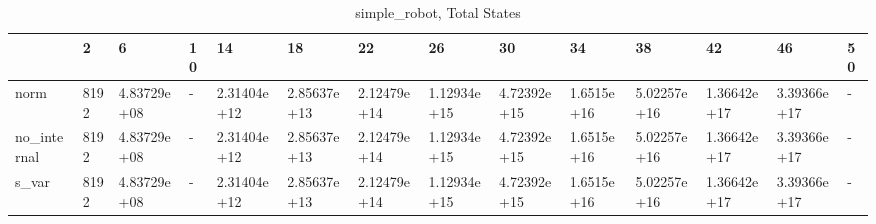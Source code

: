 \begin{table}
\caption{simple_robot, Total States}
\label{simple_robot_total}
\begin{tabular}{llllllllllllll}
\toprule
 & 2 & 6 & 10 & 14 & 18 & 22 & 26 & 30 & 34 & 38 & 42 & 46 & 50 \\
\midrule
norm & 8192 & 4.83729e+08 & - & 2.31404e+12 & 2.85637e+13 & 2.12479e+14 & 1.12934e+15 & 4.72392e+15 & 1.6515e+16 & 5.02257e+16 & 1.36642e+17 & 3.39366e+17 & - \\
no_internal & 8192 & 4.83729e+08 & - & 2.31404e+12 & 2.85637e+13 & 2.12479e+14 & 1.12934e+15 & 4.72392e+15 & 1.6515e+16 & 5.02257e+16 & 1.36642e+17 & 3.39366e+17 & - \\
s_var & 8192 & 4.83729e+08 & - & 2.31404e+12 & 2.85637e+13 & 2.12479e+14 & 1.12934e+15 & 4.72392e+15 & 1.6515e+16 & 5.02257e+16 & 1.36642e+17 & 3.39366e+17 & - \\
\bottomrule
\end{tabular}
\end{table}
